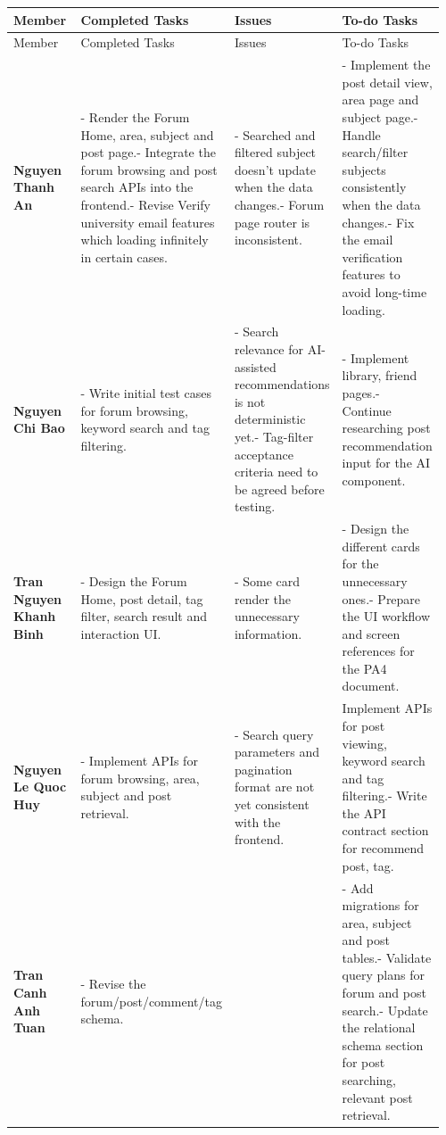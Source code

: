 \documentclass[12pt]{article}
\begin{document}
\begin{longtable}{|p{0.24\linewidth}|p{0.24\linewidth}|p{0.24\linewidth}|p{0.24\linewidth}|}
\hline
Member & Completed Tasks & Issues & To-do Tasks \\
\endfirsthead
\hline
Member & Completed Tasks & Issues & To-do Tasks \\
\endhead
\hline
\endfoot
\hline
\endlastfoot
\textbf{Nguyen Thanh An} & - Render the Forum Home, area, subject and post page.\newline- Integrate the forum browsing and post search APIs into the frontend.\newline- Revise Verify university email features which loading infinitely in certain cases. & - Searched and filtered subject doesn't update when the data changes.\newline- Forum page router is inconsistent. & - Implement the post detail view, area page and subject page.\newline- Handle search/filter subjects consistently when the data changes.\newline- Fix the email verification features to avoid long-time loading. \\
\hline
\textbf{Nguyen Chi Bao} & - Write initial test cases for forum browsing, keyword search and tag filtering. & - Search relevance for AI-assisted recommendations is not deterministic yet.\newline- Tag-filter acceptance criteria need to be agreed before testing. & - Implement library, friend pages.\newline- Continue researching post recommendation input for the AI component. \\
\hline
\textbf{Tran Nguyen Khanh Binh} & - Design the Forum Home, post detail, tag filter, search result and interaction UI. & - Some card render the unnecessary information. & - Design the different cards for the unnecessary ones.\newline- Prepare the UI workflow and screen references for the PA4 document. \\
\hline
\textbf{Nguyen Le Quoc Huy} & - Implement APIs for forum browsing, area, subject and post retrieval. & - Search query parameters and pagination format are not yet consistent with the frontend.\newline & Implement APIs for post viewing, keyword search and tag filtering.\newline- Write the API contract section for recommend post, tag.\newline \\
\hline
\textbf{Tran Canh Anh Tuan} & - Revise the forum/post/comment/tag schema.\newline &  & - Add migrations for area, subject and post tables.\newline- Validate query plans for forum and post search.\newline- Update the relational schema section for post searching, relevant post retrieval. \\
\hline
\end{longtable}
\end{document}
